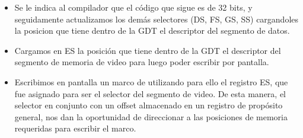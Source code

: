 \begin{itemize}
 \item Se le indica al compilador que el c\'odigo que sigue es de 32 bits, y seguidamente actualizamos los dem\'as selectores (DS, FS, GS, SS) cargandoles la posicion que tiene dentro de la GDT el descriptor del segmento de datos.

 \item Cargamos en ES la posici\'on que tiene dentro de la GDT el descriptor del segmento de memoria de video para luego poder escribir por pantalla.
 
 \item Escribimos en pantalla un marco de \* utilizando para ello el registro ES, que fue asignado para ser el selector del segmento de video. De esta manera, el selector en conjunto con un offset almacenado en un registro de prop\'osito general, nos dan la oportunidad de direccionar a las posiciones de memoria requeridas para escribir el marco.
\end{itemize}

